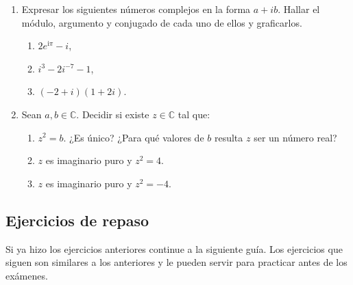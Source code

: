 \documentclass[a4paper,12pt,twoside,spanish,reqno]{amsbook}
\numberwithin{equation}{section}
\begin{document}
\begin{enumerate}[topsep=6pt, itemsep=.4cm]
\item Expresar los siguientes números complejos en la forma $a +i b$.
Hallar el módulo, argumento y conjugado de cada uno de ellos y graficarlos.
\begin{multicols}{3}
    \begin{enumerate}
        \item $2e^{\mathrm{i}\pi}-i$,
        \item $ i^3 - 2i^{-7} -1$,
        \item $(-2+i) (1+2i)$.
    \end{enumerate}
\end{multicols}


\item Sean $a,b\in\mathbb{C}$. Decidir si existe $z \in \mathbb{C}$ tal que:
\begin{enumerate}
    \item $z^2=b$. ¿Es único? ¿Para qué valores de $b$ resulta $z$ ser un número real?
    \item $z$ es imaginario puro y $z^2=4$.
    \item $z$ es imaginario puro y $z^2=-4$.
\end{enumerate}



\end{enumerate}

\subsection*{Ejercicios de repaso} Si ya hizo los ejercicios anteriores continue a la siguiente guía. Los ejercicios que siguen son similares a los anteriores y le pueden servir para practicar antes de los exámenes.
\end{document}
